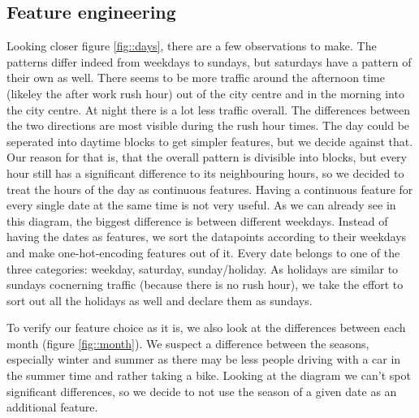 \documentclass[12pt,a4paper]{scrartcl}		%
\begin{document}
\subsection{Feature engineering}
Looking closer figure \ref{fig::days}, there are a few observations to make. 
The patterns differ indeed from weekdays to sundays, but saturdays have a pattern of their own as well.
There seems to be more traffic around the afternoon time (likeley the after work rush hour) out of the city centre 
and in the morning into the city centre. At night there is a lot less traffic overall.
The differences between the two directions are most visible during the rush hour times. 
The day could be seperated into daytime blocks to get simpler features, but we decide against that. 
Our reason for that is, that the overall pattern is divisible into blocks, but every hour still has a significant
difference to its neighbouring hours, so we decided to treat the hours of the day as continuous features.
Having a continuous feature for every single date at the same time is not very useful. As we can already see in this 
diagram, the biggest difference is between different weekdays. 
Instead of having the dates as features, we sort the datapoints according to their weekdays and make one-hot-encoding 
features out of it. Every date belongs to one of the three categories: weekday, saturday, sunday/holiday.
As holidays are similar to sundays cocnerning traffic (because there is no rush hour), we take the effort to sort out 
all the holidays as well and declare them as sundays.

To verify our feature choice as it is, we also look at the differences between each month (figure \ref{fig::month}).
We suspect a difference between the seasons, especially winter and summer as there may be less people driving with a car 
in the summer time and rather taking a bike. Looking at the diagram we can't spot significant differences, so we decide 
to not use the season of a given date as an additional feature.

\begin{lstlisting}[language=Python]
\end{lstlisting}
\end{document}
